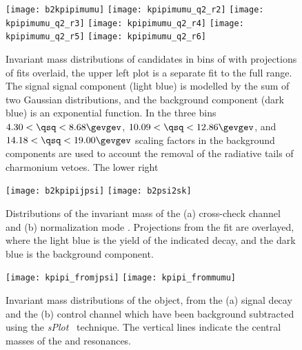 



\begin{figure}
  \begin{center}
    \texttt{[image: b2kpipimumu]}
    \texttt{[image: kpipimumu\_q2\_r2]}
    \texttt{[image: kpipimumu\_q2\_r3]}
    \texttt{[image: kpipimumu\_q2\_r4]}
    \texttt{[image: kpipimumu\_q2\_r5]}
    \texttt{[image: kpipimumu\_q2\_r6]}
    \caption{\small
      Invariant mass distributions of \btokpipimumu candidates in bins of \qsq with projections of
      fits overlaid, the upper left plot is a separate fit to the full \qsq range.
      The signal signal component (light blue) is modelled by the sum of two Gaussian
      distributions, and the background component (dark blue) is an exponential function.
      In the three \qsq bins $4.30<\qsq<8.68\gevgev$, $10.09<\qsq<12.86\gevgev$, and
      $14.18<\qsq<19.00\gevgev$ scaling factors in the background components are used to account
      the removal of the radiative tails of charmonium vetoes.
      The lower right
    }
    \label{}
  \end{center}
\end{figure}



\begin{figure}
  \begin{center}
    \texttt{[image: b2kpipijpsi]}
    \texttt{[image: b2psi2sk]}
    \caption{\small
      Distributions of the invariant mass of the
      (a) cross-check channel \btojpsikpipi and
      (b) normalization mode \btopsitwosk.
      Projections from the fit are overlayed, where the light blue is the yield of the indicated
      decay, and the dark blue is the background component.
    }
    \label{fig:hhh:norm}
  \end{center}
\end{figure}



\begin{figure}
  \begin{center}
    \texttt{[image: kpipi\_fromjpsi]}
    \texttt{[image: kpipi\_frommumu]}
    \caption{\small
      Invariant mass distributions of the \kpipi object, from the
      (a) signal decay \btokpipimumu and the
      (b) control channel \btojpsikpipi which have been background subtracted
      using the \emph{sPlot}~\cite{splot} technique.
      The vertical lines indicate the central masses of the  and 
      resonances.
    }
    \label{fig:hhh:kpipi}
  \end{center}
\end{figure}



